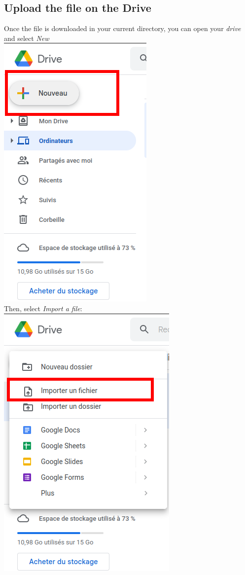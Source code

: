\documentclass[10pt,a4paper]{article}
\begin{document}
\subsection{Upload the file on the Drive}
Once the file is downloaded in your current directory, you can open your \textit{drive} and select \textit{New} \\
\includegraphics[scale=0.4]{newfile.png}\\
Then, select \textit{Import a file}:\\
\includegraphics[scale=0.4]{importfile.png}\\
\end{document}
